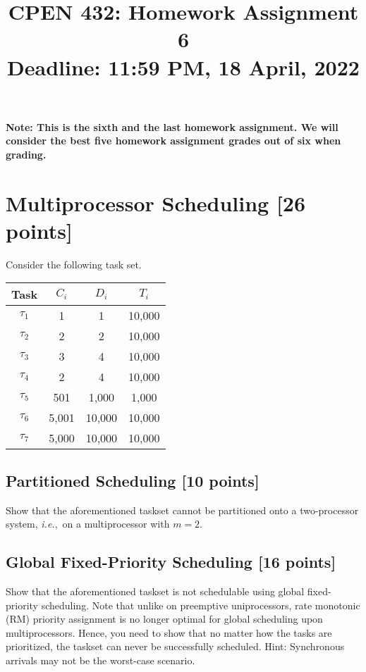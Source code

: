 \documentclass[12pt]{article}
\title{
  CPEN 432: Homework Assignment 6 \\
  \large
  Deadline: 11:59 PM, 18 April, 2022
}
\date{}
\newcommand{\ie}{{\textit{i.e.}}}
\begin{document}
\maketitle

\setlength{\baselineskip}{0.90\baselineskip}

\pagestyle{empty}

\noindent
\textbf{Note: This is the sixth and the last homework assignment.
We will consider the best five homework assignment grades out of six when
grading.}

\section{Multiprocessor Scheduling [26 points]}

Consider the following task set.
\begin{table}[h]
\begin{center}
\begin{tabular}{cccc}
\toprule
Task & $C_{i}$ & $D_{i}$ & $T_i$ \\ 
  \midrule
$\tau_{1}$ & 1 & 1 & 10,000 \\
$\tau_{2}$ & 2 & 2 & 10,000 \\
$\tau_{3}$ & 3 & 4 & 10,000 \\
$\tau_{4}$ & 2 & 4 & 10,000 \\ 
$\tau_{5}$ & 501 & 1,000 & 1,000\\ 
$\tau_{6}$ & 5,001 & 10,000 & 10,000 \\ 
$\tau_{7}$ & 5,000 & 10,000 & 10,000 \\ 
  \bottomrule
\end{tabular}
\end{center}
\end{table}

\subsection{Partitioned Scheduling [10 points]}

Show that the aforementioned taskset cannot be partitioned onto a two-processor
system, \ie,~on a multiprocessor with $m=2$.

\subsection{Global Fixed-Priority Scheduling [16 points]}

Show that the aforementioned taskset is not schedulable using global
fixed-priority scheduling. Note that unlike on preemptive uniprocessors, rate
monotonic (RM) priority assignment is no longer optimal for global scheduling
upon multiprocessors. Hence, you need to show that no matter how the tasks are
prioritized, the taskset can never be successfully scheduled.
Hint: Synchronous arrivals may not be the worst-case scenario.
\end{document}
